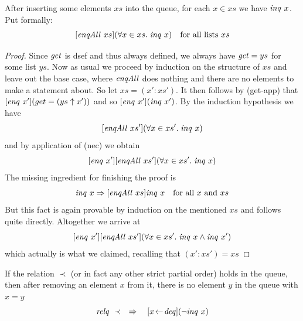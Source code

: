 \begin{lem}
\label{thm:enqAll-inq}
After inserting some elements $xs$ into the queue, for each $x\in xs$ we have
$\mathit{inq}~x$. Put formally:
\[
[\mathit{enqAll}~xs](\forall x\in xs.\; \mathit{inq}~x) \quad \text{for all lists $xs$}
\]
\end{lem}
\begin{proof}
  Since $\mathit{get}$ is dsef and thus always defined, we always have $\mathit{get} = ys$ for
  some list $ys$. Now as usual we proceed by induction on the structure of $xs$ and
  leave out the base case, where $\mathit{enqAll}$ does nothing and there are no
  elements to make a statement about. So let $xs = (x':xs')$.  It then follows
  by (get-app) that $[\mathit{enq}~x'](get = (ys \uparrow x'))$ and so $[\mathit{enq}~x'](\mathit{inq}~x')$. By
  the induction hypothesis we have
\[
[\mathit{enqAll}~xs'](\forall x\in xs'.\; \mathit{inq}~x)
\]
and by application of (nec) we obtain
\[
[\mathit{enq}~x'][\mathit{enqAll}~xs'](\forall x\in xs'.\; \mathit{inq}~x)
\]
The missing ingredient for finishing the proof is
\[
\mathit{inq}~x \Rightarrow [\mathit{enqAll}~xs]\mathit{inq}~x \quad \text{for all $x$ and $xs$}
\]
But this fact is again provable by induction on the mentioned $xs$ and follows
quite directly. Altogether we arrive at
\[
[\mathit{enq}~x'][\mathit{enqAll}~xs'](\forall x\in xs'.\; \mathit{inq}~x \land \mathit{inq}~x')
\]
which actually is what we claimed, recalling that $(x':xs') = xs$
\end{proof}







\begin{lem}
\label{deq-inq}
If the relation $\prec$ (or in fact any other strict partial order) holds in the
queue, then after removing an element $x$ from it, there is no element $y$ in
the queue with $x = y$
\[
\mathit{relq}~\prec \quad\Rightarrow\quad [x \!\gets\! \mathit{deq}](\lnot \mathit{inq}~x)
\]
\end{lem}

